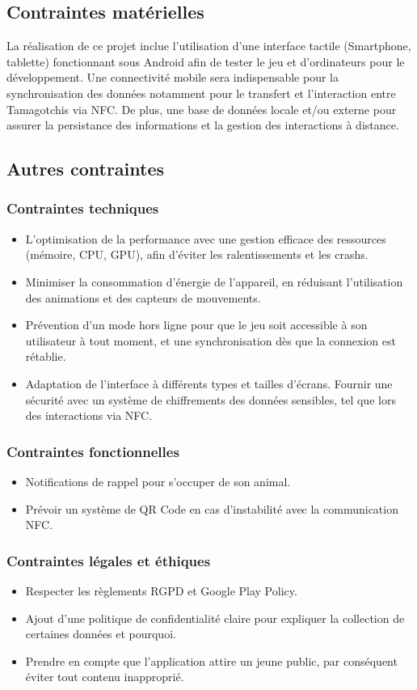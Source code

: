 \documentclass{rapportECL}
\begin{document}
\subsection{Contraintes matérielles}
La réalisation de ce projet inclue l’utilisation d’une interface tactile (Smartphone, tablette) fonctionnant sous Android afin de tester le jeu et d’ordinateurs pour le développement. Une connectivité mobile sera indispensable pour la synchronisation des données notamment pour le transfert et l’interaction entre Tamagotchis via NFC.
De plus, une base de données locale et/ou externe pour assurer la persistance des informations et la gestion des interactions à distance.
\subsection{Autres contraintes}
\subsubsection{Contraintes techniques}
\begin{itemize}[label=\textbullet]
\item L’optimisation de la performance avec une gestion efficace des ressources (mémoire, CPU, GPU), afin d’éviter les ralentissements et les crashs.
\item Minimiser la consommation d'énergie de l’appareil, en réduisant l’utilisation des animations et des capteurs de mouvements.
\item Prévention d’un mode hors ligne pour que le jeu soit accessible à son utilisateur à tout moment, et une synchronisation dès que la connexion est rétablie.
\item Adaptation de l’interface à différents types et tailles d’écrans.
Fournir une sécurité avec un système de chiffrements des données sensibles, tel que lors des interactions via NFC.
\end{itemize}
\subsubsection{Contraintes fonctionnelles}
\begin{itemize}[label=\textbullet]
\item Notifications de rappel pour s’occuper de son animal.
\item Prévoir un système de QR Code en cas d’instabilité avec la communication NFC.
\end{itemize}
\subsubsection{Contraintes légales et éthiques}
\begin{itemize}[label=\textbullet]
\item Respecter les règlements RGPD et Google Play Policy.
\item Ajout d’une politique de confidentialité claire pour expliquer la collection de certaines données et pourquoi.
\item Prendre en compte que l’application attire un jeune public, par conséquent éviter tout contenu inapproprié.
\end{itemize}
\end{document}
